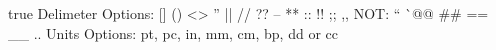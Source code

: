 {{{{{{{{\ifstrequal{\currentseries}{\seriesm}{true}{false}
\ignorespacesafterend
Delimeter Options: {} [] () <> '' || // ?? -- ** :: !! ;; ,, NOT: `` ^^ @@ ## == __ ..
Units Options: pt, pc, in, mm, cm, bp, dd or cc
}}}}}}}}
